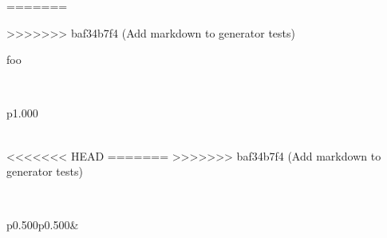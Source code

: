 \label{Recent--type-gadt}\begin{ocamlindent}\label{Recent--type-gadt.A}%
\begin{ocamlindent}\end{ocamlindent}%
\label{Recent--type-gadt.B}%
=======
\label{Recent-type-gadt}\begin{ocamlindent}\label{Recent-type-gadt.A}%
\begin{ocamlindent}\end{ocamlindent}%
\label{Recent-type-gadt.B}%
>>>>>>> baf34b7f4 (Add markdown to generator tests)
\begin{ocamlindent}foo\end{ocamlindent}%
\\
\begin{ocamltabular}{p{1.000\textwidth}}\label{Recent--type-gadt.a}\\
\end{ocamltabular}%
\\
<<<<<<< HEAD
\label{Recent--type-gadt.C}%
=======
\label{Recent-type-gadt.C}%
>>>>>>> baf34b7f4 (Add markdown to generator tests)
\begin{ocamlindent}\end{ocamlindent}%
\end{ocamlindent}%
\label{Recent--type-polymorphic_variant}\ocamlcodefragment{\ocamltag{keyword}{type} polymorphic\_\allowbreak{}variant = [ }\\
\begin{ocamltabular}{p{0.500\textwidth}p{0.500\textwidth}}\label{Recent--type-polymorphic_variant.A}& \\

\end{ocamltabular}
\end{ocamlindent}
